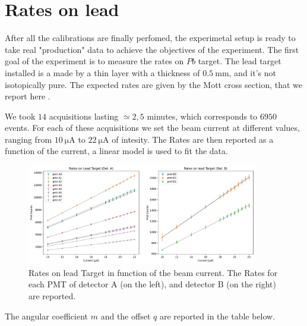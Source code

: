 \section{Rates on lead}

After all the calibrations are finally perfomed, the experimetal setup is ready to take real "production" data 
to achieve the objectives of the experiment. The first goal of the experiment is to measure the rates on $Pb$ target.
The lead target installed is a made by a thin layer with a thickness of $\SI{0.5}{\milli \meter}$, and it's not isotopically pure. The expected rates are given by the Mott cross section, that we report here .\medskip

We took $14$ acquisitions lasting $\simeq 2,5$ minutes, which corresponds to $6950$ events. For each of these acquisitions we set the beam current at different values, ranging from $\SI{10}{\micro \ampere}$ to $\SI{22}{\micro \ampere}$ of intesity. The Rates are then reported as a function of the current, a linear model is used to fit the data.

\begin{figure}[hbtp]
\centering
\includegraphics[width = 0.9\textwidth]{Analysis/LeadRates/LeadRates.pdf}
\caption{Rates on lead Target in function of the beam current. The Rates for each PMT of detector A (on the left), and detector B (on the right) are reported.}
\end{figure}

The angular coefficient $m$ and the offset $q$ are reported in the table below. 

